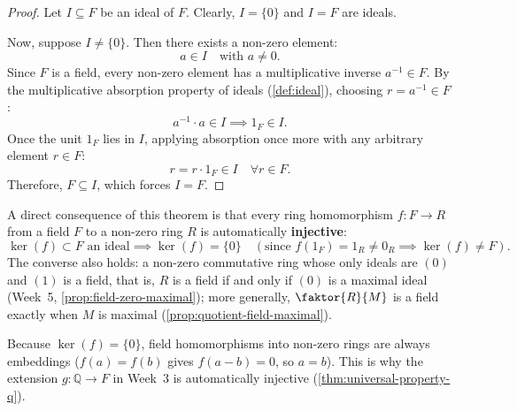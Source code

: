 \begin{content}

\begin{proof}
Let $I \subseteq F$ be an ideal of $F$. Clearly, $I = \{0\}$ and $I = F$ are ideals.

Now, suppose $I \neq \{0\}$. Then there exists a non-zero element:
\[
a \in I \quad \text{with } a \neq 0.
\]
Since $F$ is a field, every non-zero element has a multiplicative inverse $a^{-1} \in F$. By the multiplicative absorption property of ideals (\cref{def:ideal}), choosing $r = a^{-1} \in F$:
\[
a^{-1} \cdot a \in I \implies 1_F \in I.
\]
Once the unit $1_F$ lies in $I$, applying absorption once more with any arbitrary element $r \in F$:
\[
r = r \cdot 1_F \in I \quad \forall r \in F.
\]
Therefore, $F \subseteq I$, which forces $I = F$.
\end{proof}

\begin{steps}
A direct consequence of this theorem is that every ring homomorphism $f \colon F \to R$ from a field $F$ to a non-zero ring $R$ is automatically \textbf{injective}:
\[
\ker(f) \subset F \text{ an ideal} \implies \ker(f) = \{0\} \quad (\text{since } f(1_F) = 1_R \neq 0_R \implies \ker(f) \neq F).
\]
The converse also holds: a non-zero commutative ring whose only ideals are $(0)$ and $(1)$ is a field, that is, $R$ is a field if and only if $(0)$ is a maximal ideal (Week~5, \cref{prop:field-zero-maximal}); more generally, $\faktor{R}{M}$ is a field exactly when $M$ is maximal (\cref{prop:quotient-field-maximal}).

Because $\ker(f) = \{0\}$, field homomorphisms into non-zero rings are always embeddings ($f(a) = f(b)$ gives $f(a - b) = 0$, so $a = b$). This is why the extension $g \colon \mathbb{Q} \to F$ in Week~3 is automatically injective (\cref{thm:universal-property-q}).
\end{steps}
\end{content}

